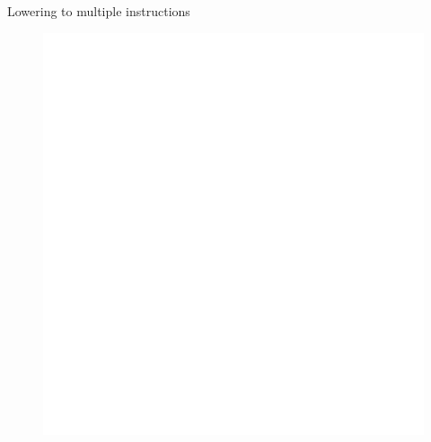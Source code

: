 \begin{frame}{Lowering to multiple instructions}
\begin{minipage}[t]{0.58\linewidth}
\begin{itemize}
    \end{itemize}
\end{minipage}
\begin{minipage}[t]{0.41\linewidth}
    \begin{figure}
        \vspace{-3.5ex}
        \includegraphics[width = 1.00\textwidth]{examples/ex5/ex5-post-isel.pdf}
    \end{figure}
\end{minipage}

\end{frame}


